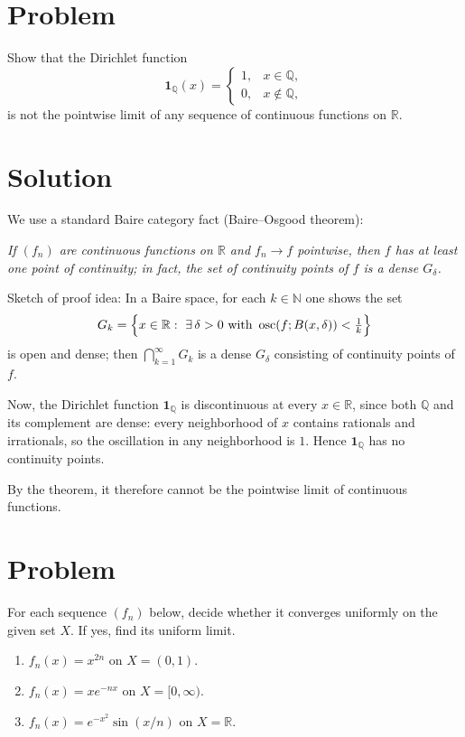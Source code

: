 \documentclass[12pt,a4paper]{article}
\begin{document}
\section*{Problem}
Show that the Dirichlet function
\[
\mathbf{1}_{\mathbb{Q}}(x)=
\begin{cases}
	1,& x\in\mathbb{Q},\\
	0,& x\notin\mathbb{Q},
\end{cases}
\]
is not the pointwise limit of any sequence of continuous functions on $\mathbb{R}$.

\section*{Solution}
We use a standard Baire category fact (Baire--Osgood theorem):

\medskip
\emph{If $(f_n)$ are continuous functions on $\mathbb{R}$ and $f_n\to f$ pointwise, then $f$ has at least one point of continuity; in fact, the set of continuity points of $f$ is a dense $G_\delta$.}

\smallskip
Sketch of proof idea: In a Baire space, for each $k\in\mathbb{N}$ one shows the set
\[
G_k=\Bigl\{x\in\mathbb{R}:\ \exists\,\delta>0\text{ with }\operatorname{osc}(f;B(x,\delta))<\tfrac1k\Bigr\}
\]
is open and dense; then $\bigcap_{k=1}^\infty G_k$ is a dense $G_\delta$ consisting of continuity points of $f$.

Now, the Dirichlet function $\mathbf{1}_{\mathbb{Q}}$ is discontinuous at every $x\in\mathbb{R}$, since both $\mathbb{Q}$ and its complement are dense: every neighborhood of $x$ contains rationals and irrationals, so the oscillation in any neighborhood is $1$. Hence $\mathbf{1}_{\mathbb{Q}}$ has no continuity points.

By the theorem, it therefore cannot be the pointwise limit of continuous functions.
	
	
\section*{Problem}
For each sequence $(f_n)$ below, decide whether it converges uniformly on the given set $X$. If yes, find its uniform limit.
\begin{enumerate}[label=(\alph*)]
	\item $f_n(x)=x^{2n}$ on $X=(0,1)$.
	\item $f_n(x)=x e^{-nx}$ on $X=[0,\infty)$.
	\item $f_n(x)=e^{-x^2}\sin(x/n)$ on $X=\mathbb{R}$.
\end{enumerate}
\end{document}
